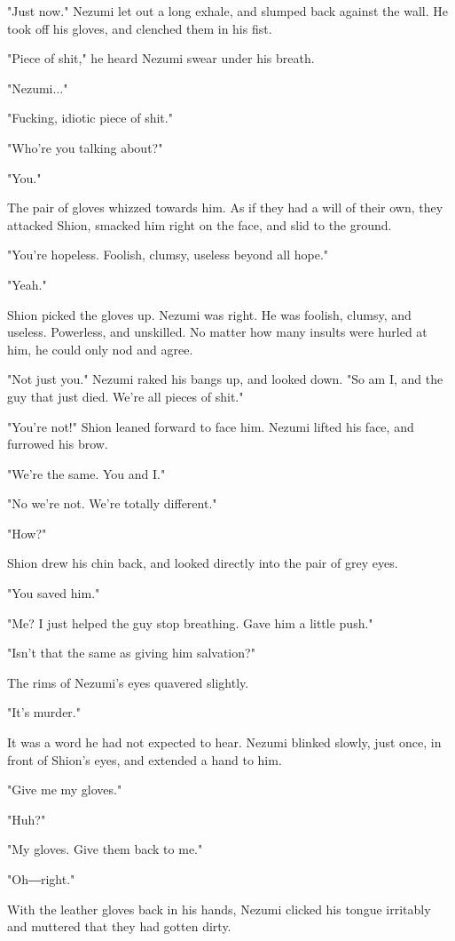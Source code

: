 "Just now." Nezumi let out a long exhale, and slumped back against the
wall. He took off his gloves, and clenched them in his fist.

"Piece of shit," he heard Nezumi swear under his breath.

"Nezumi..."

"Fucking, idiotic piece of shit."

"Who're you talking about?"

"You."

The pair of gloves whizzed towards him. As if they had a will of their
own, they attacked Shion, smacked him right on the face, and slid to the
ground.

"You're hopeless. Foolish, clumsy, useless beyond all hope."

"Yeah."

Shion picked the gloves up. Nezumi was right. He was foolish, clumsy,
and useless. Powerless, and unskilled. No matter how many insults were
hurled at him, he could only nod and agree.

"Not just you." Nezumi raked his bangs up, and looked down. "So am I,
and the guy that just died. We're all pieces of shit."

"You're not!" Shion leaned forward to face him. Nezumi lifted his face,
and furrowed his brow.

"We're the same. You and I."

"No we're not. We're totally different."

"How?"

Shion drew his chin back, and looked directly into the pair of grey
eyes.

"You saved him."

"Me? I just helped the guy stop breathing. Gave him a little push."

"Isn't that the same as giving him salvation?"

The rims of Nezumi's eyes quavered slightly.

"It's murder."

It was a word he had not expected to hear. Nezumi blinked slowly, just
once, in front of Shion's eyes, and extended a hand to him.

"Give me my gloves."

"Huh?"

"My gloves. Give them back to me."

"Oh―right."

With the leather gloves back in his hands, Nezumi clicked his tongue
irritably and muttered that they had gotten dirty.

